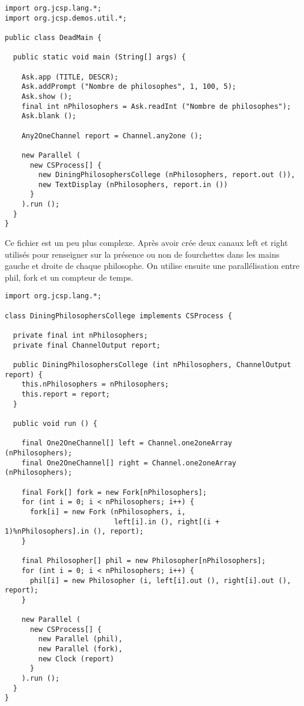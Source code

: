 \documentclass[a4paper,11pt,french]{report}
\begin{document}
\begin{lstlisting}[frame=trBL,title={Dîner des philosophes : DeadMain.java}]
import org.jcsp.lang.*;
import org.jcsp.demos.util.*;

public class DeadMain {

  public static void main (String[] args) {

  	Ask.app (TITLE, DESCR);
  	Ask.addPrompt ("Nombre de philosophes", 1, 100, 5);
  	Ask.show ();
  	final int nPhilosophers = Ask.readInt ("Nombre de philosophes");
  	Ask.blank ();

    Any2OneChannel report = Channel.any2one ();

    new Parallel (
      new CSProcess[] {
        new DiningPhilosophersCollege (nPhilosophers, report.out ()),
        new TextDisplay (nPhilosophers, report.in ())
      }
    ).run ();
  }
}
\end{lstlisting}

Ce fichier est un peu plus complexe. Après avoir crée deux canaux left et right utilisés pour renseigner sur la présence ou non de fourchettes dans les mains gauche et droite de chaque philosophe. On utilise ensuite une parallélisation entre phil, fork et un compteur de temps.

\begin{lstlisting}[frame=trBL,title={Dîner des philosophes : DiningPhilosophersCollege.java}]
import org.jcsp.lang.*;

class DiningPhilosophersCollege implements CSProcess {

  private final int nPhilosophers;
  private final ChannelOutput report;

  public DiningPhilosophersCollege (int nPhilosophers, ChannelOutput report) {
    this.nPhilosophers = nPhilosophers;
    this.report = report;
  }

  public void run () {

    final One2OneChannel[] left = Channel.one2oneArray (nPhilosophers);
    final One2OneChannel[] right = Channel.one2oneArray (nPhilosophers);

    final Fork[] fork = new Fork[nPhilosophers];
    for (int i = 0; i < nPhilosophers; i++) {
      fork[i] = new Fork (nPhilosophers, i,
                          left[i].in (), right[(i + 1)%nPhilosophers].in (), report);
    }

    final Philosopher[] phil = new Philosopher[nPhilosophers];
    for (int i = 0; i < nPhilosophers; i++) {
      phil[i] = new Philosopher (i, left[i].out (), right[i].out (), report);
    }

    new Parallel (
      new CSProcess[] {
        new Parallel (phil),
        new Parallel (fork),
        new Clock (report)
      }
    ).run ();
  }
}
\end{lstlisting}
\end{document}
